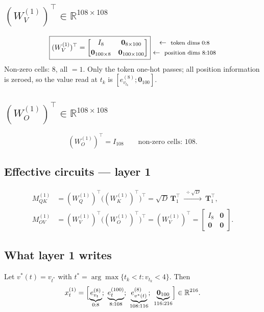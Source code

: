 \documentclass[11pt]{article}
\newcommand{\R}{\mathbb{R}}
\newcommand{\Wq}{W_Q}
\newcommand{\Wk}{W_K}
\newcommand{\Wv}{W_V}
\newcommand{\Wo}{W_O}
\newcommand{\sd}{\sqrt{D}}
\newcommand{\rowlab}[1]{\ \leftarrow\ \text{\footnotesize #1}}
\begin{document}
\subsection{$(\Wv^{(1)})^\top\in\R^{108\times108}$}
\begin{equation}
\boxed{(\Wv^{(1)})^\top=
\begin{bmatrix}
I_{8} & \bm{0}_{8\times100}\\[2pt]
\bm{0}_{100\times8} & \bm{0}_{100\times100}
\end{bmatrix}}
\begin{matrix}
\rowlab{token dims $0{:}8$}\\[2pt]
\rowlab{position dims $8{:}108$}
\end{matrix}
\end{equation}
Non-zero cells: $8$, all $=1$. Only the token one-hot passes; all position information is zeroed,
so the value read at $t_k$ is $[e^{(8)}_{v_{t_k}};\bm{0}_{100}]$.

\subsection{$(\Wo^{(1)})^\top\in\R^{108\times108}$}
\begin{equation}
\boxed{(\Wo^{(1)})^\top=I_{108}}\qquad\text{non-zero cells: }108 .
\end{equation}

\subsection{Effective circuits --- layer 1}
\begin{align}
M^{(1)}_{QK}&=(\Wq^{(1)})^\top\bigl((\Wk^{(1)})^\top\bigr)^\top=\sd\,\bm{T}_1^\top
\ \xrightarrow{\ \div\sd\ }\ \bm{T}_1^\top,\\
M^{(1)}_{OV}&=(\Wv^{(1)})^\top\bigl((\Wo^{(1)})^\top\bigr)^\top=(\Wv^{(1)})^\top=
\begin{bmatrix}I_8&\bm{0}\\\bm{0}&\bm{0}\end{bmatrix}.
\end{align}

\subsection{What layer 1 writes}
Let $v^*(t)=v_{t^*}$ with $t^*=\arg\max\{t_k<t: v_{t_k}<4\}$. Then
\begin{equation}
x^{(1)}_t=\Bigl[\underbrace{e^{(8)}_{v_t}}_{0:8};\ \underbrace{e^{(100)}_t}_{8:108};\
\underbrace{e^{(8)}_{v^*(t)}}_{108:116};\ \underbrace{\bm{0}_{100}}_{116:216}\Bigr]\in\R^{216}.
\end{equation}
\end{document}
